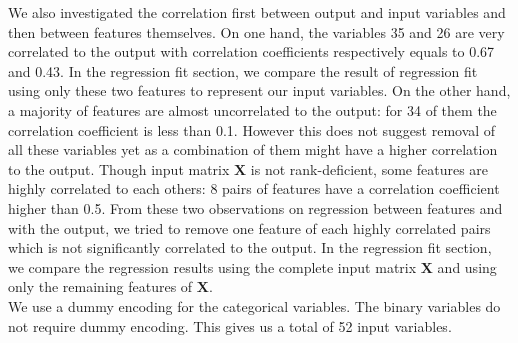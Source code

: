 \documentclass{article} %
\begin{document}
  We also investigated the correlation first between output and input variables and then between features themselves. On one hand, the variables  35 and 26 are very correlated to the output with correlation coefficients respectively equals to 0.67 and 0.43. In the regression fit section, we compare the result of regression fit using only these two features to represent our input variables. On the other hand, a majority of features are almost uncorrelated to the output: for 34 of them the correlation coefficient is less than 0.1. However this does not suggest removal of all these variables yet as a combination of them might have a higher correlation to the output. Though input matrix $\mathbf{X}$ is not rank-deficient, some features are highly correlated to each others: 8 pairs of features have a correlation coefficient higher than 0.5. From these two observations on regression between features and with the output, we tried to remove one feature of each highly correlated pairs which is not significantly correlated to the output. In the regression fit section, we compare the regression results using the complete input matrix $\mathbf{X}$ and using only the remaining features of $\mathbf{X}$.\\
  
  We use a dummy encoding for the categorical variables. The binary variables do not require dummy encoding. This gives us a total of  52 input variables.
\end{document}
